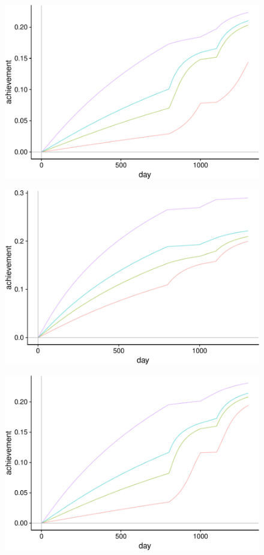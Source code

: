 \documentclass[english,floatsintext,man]{apa6}
\theoremstyle{definition}
\theoremstyle{definition}
\theoremstyle{definition}
\theoremstyle{remark}
\begin{document}
\begin{figure}[htbp]
\centering
\includegraphics{Matthew_effect_origin_AERA2018_files/figure-latex/unnamed-chunk-3-1.pdf}
\caption{}
\end{figure}

\begin{figure}[htbp]
\centering
\includegraphics{Matthew_effect_origin_AERA2018_files/figure-latex/unnamed-chunk-4-1.pdf}
\caption{}
\end{figure}

\begin{figure}[htbp]
\centering
\includegraphics{Matthew_effect_origin_AERA2018_files/figure-latex/unnamed-chunk-5-1.pdf}
\caption{}
\end{figure}
\end{document}
